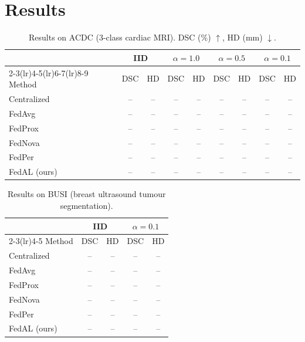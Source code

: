 \section{Results}
\label{sec:results}

\begin{table}[t]
\centering
\caption{Results on ACDC (3-class cardiac MRI). DSC (\%) $\uparrow$, HD (mm) $\downarrow$.}
\label{tab:acdc}
\begin{tabular}{lcccccccc}
\toprule
& \multicolumn{2}{c}{IID} & \multicolumn{2}{c}{$\alpha=1.0$}
& \multicolumn{2}{c}{$\alpha=0.5$} & \multicolumn{2}{c}{$\alpha=0.1$} \\
\cmidrule(lr){2-3}\cmidrule(lr){4-5}\cmidrule(lr){6-7}\cmidrule(lr){8-9}
Method & DSC & HD & DSC & HD & DSC & HD & DSC & HD \\
\midrule
Centralized   & --   & --   & --   & --   & --   & --   & --   & -- \\
\midrule
FedAvg        & --   & --   & --   & --   & --   & --   & --   & -- \\
FedProx       & --   & --   & --   & --   & --   & --   & --   & -- \\
FedNova       & --   & --   & --   & --   & --   & --   & --   & -- \\
FedPer        & --   & --   & --   & --   & --   & --   & --   & -- \\
\midrule
FedAL (ours)  & --   & --   & --   & --   & --   & --   & --   & -- \\
\bottomrule
\end{tabular}
\end{table}

\begin{table}[t]
\centering
\caption{Results on BUSI (breast ultrasound tumour segmentation).}
\label{tab:busi}
\begin{tabular}{lcccc}
\toprule
& \multicolumn{2}{c}{IID} & \multicolumn{2}{c}{$\alpha=0.1$} \\
\cmidrule(lr){2-3}\cmidrule(lr){4-5}
Method & DSC & HD & DSC & HD \\
\midrule
Centralized   & --   & --   & --   & -- \\
\midrule
FedAvg        & --   & --   & --   & -- \\
FedProx       & --   & --   & --   & -- \\
FedNova       & --   & --   & --   & -- \\
FedPer        & --   & --   & --   & -- \\
\midrule
FedAL (ours)  & --   & --   & --   & -- \\
\bottomrule
\end{tabular}
\end{table}

